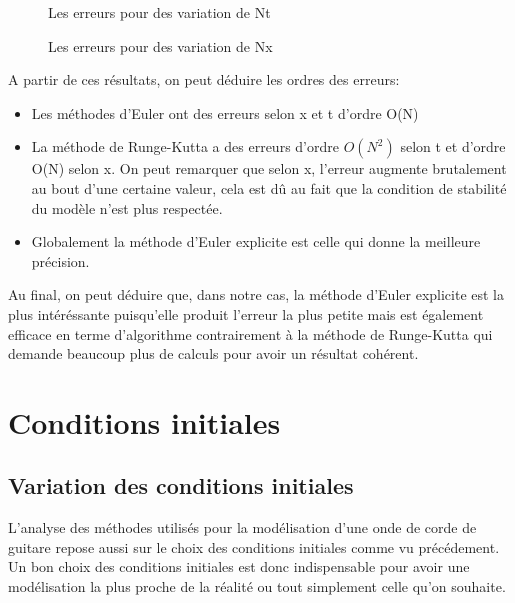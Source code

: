\begin{figure}[H]
\begin{center}
\centering{}
\caption{Les erreurs pour des variation de Nt\label{fig1}}
\end{center}
\end{figure}

\begin{figure}[H]
\begin{center}
\centering{}
\caption{Les erreurs pour des variation de Nx\label{fig1}}
\end{center}
\end{figure}

A partir de ces résultats, on peut déduire les ordres des erreurs:
\begin{itemize}
    \item Les méthodes d'Euler ont des erreurs selon x et t d'ordre O(N)
    \item La méthode de Runge-Kutta a des erreurs  d'ordre $O(N^2)$ selon t et d'ordre O(N) selon x. On peut remarquer que selon x, l'erreur augmente brutalement au bout d'une certaine valeur, cela est dû au fait que la condition de stabilité du modèle n'est plus respectée.
    \item Globalement la méthode d'Euler explicite est celle qui donne la meilleure précision.
\end{itemize}

Au final, on peut déduire que, dans notre cas, la méthode d'Euler explicite est la plus intéréssante puisqu'elle produit l'erreur la plus petite mais est également efficace en terme d'algorithme contrairement à la méthode de Runge-Kutta qui demande beaucoup plus de calculs pour avoir un résultat cohérent.

\section{Conditions initiales}

\subsection{Variation des conditions initiales}


L'analyse des méthodes utilisés pour la modélisation d'une onde  de corde de guitare repose aussi sur le choix des conditions initiales comme vu précédement.
Un bon choix des conditions initiales est donc indispensable pour avoir une modélisation la plus proche de la réalité ou tout simplement celle qu'on souhaite.\\


